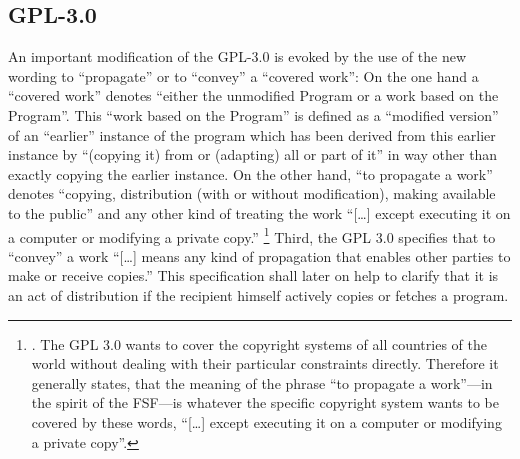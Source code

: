 \subsection{GPL-3.0}

An important modification of the GPL-3.0 is evoked by the use of the new wording
to \enquote{propagate} or to \enquote{convey} a \enquote{covered work}: On the
one hand a \enquote{covered work} denotes \enquote{either the unmodified Program
or a work based on the Program}. This \enquote{work based on the Program} is
defined as a \enquote{modified version} of an \enquote{earlier} instance of the
program which has been derived from this earlier instance by \enquote{(copying
it) from or (adapting) all or part of it} in way other than exactly copying the
earlier instance. On the other hand, \enquote{to propagate a
work} denotes \enquote{copying, distribution (with or without modification),
making available to the public} and any other kind of treating the work
\enquote{[\ldots] except executing it on a computer or modifying a private
copy.}%
  \footnote{\cite[cf.][\nopage wp. §0]{Gpl30OsiLicense2007a}. The GPL 3.0 wants
  to cover the copyright systems of all countries of the world without dealing
  with their particular constraints directly. Therefore it generally states,
  that the meaning of the phrase \enquote{to propagate a work}---in the spirit
  of the FSF---is whatever the specific copyright system wants to be covered by
  these words, \enquote{[\ldots] except executing it on a computer or modifying
  a private copy}.}
Third, the GPL 3.0 specifies that to \enquote{convey} a work \enquote{[\ldots]
means any kind of propagation that enables other parties to make or receive
copies.} This specification shall later on help to clarify that
it is an act of distribution if the recipient himself actively copies or fetches
a program. 

